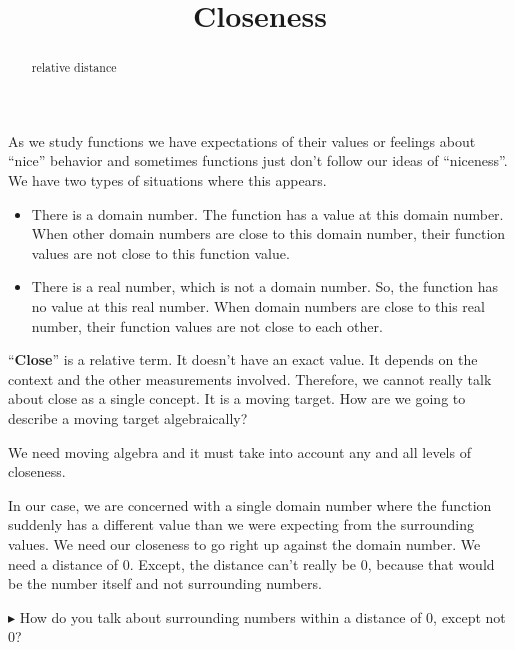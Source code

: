 \documentclass{ximera}
\title{Closeness}
\begin{document}
\begin{abstract}
relative distance
\end{abstract}
\maketitle







As we study functions we have expectations of their values or feelings about ``nice'' behavior and sometimes functions just don't follow our ideas of ``niceness''.  We have two types of situations where this appears.

\begin{itemize}
\item There is a domain number. The function has a value at this domain number. When other domain numbers are close to this domain number, their function values are not close to this function value.
\item There is a real number, which is not  a domain number. So, the function has no value at this real number. When  domain numbers are close to this real number, their function values are not close to each other.
\end{itemize}



``\textbf{\textcolor{purple!85!blue}{Close}}'' is a relative term.  It doesn't have an exact value.  It depends on the context and the other measurements involved.  Therefore, we cannot really talk about close as a single concept.  It is a moving target.  How are we going to describe a moving target algebraically?

We need moving algebra and it must take into account any and all levels of closeness.


In our case, we are concerned with a single domain number where the function suddenly has a different value than we were expecting from the surrounding values.  We need our closeness to go right up against the domain number. We need a distance of $0$.  Except, the distance can't really be $0$, because that would be the number itself and not surrounding numbers.

\textbf{\textcolor{red!90!darkgray}{$\blacktriangleright$}}  How do you talk about surrounding numbers within a distance of $0$, except not $0$?
\end{document}
